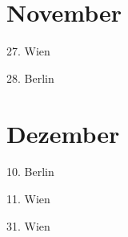 \documentclass[twoside=false,titlepage=false,open=any, parskip=never, fontsize=10pt, headings=small, chapterprefix=false, appendixprefix=false, DIV=15]{scrbook}
\begin{document}
\begin{multicols}{3}
            \section*{November}
            27. Wien\par
            28. Berlin\par
            \section*{Dezember}
            10. Berlin\par
            11. Wien\par
            31. Wien\par
            
        \end{multicols}
\end{document}
